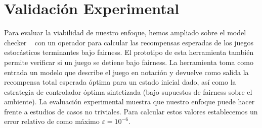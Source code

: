 \section{Validación Experimental} \label{sec:experimental_eval_fair}


Para evaluar la viabilidad de nuestro enfoque, hemos ampliado sobre el model checker {\Prism}~\cite{DBLP:conf/cav/KwiatkowskaN0S20,DBLP:conf/cav/KwiatkowskaNP11} con un operador para calcular las recompensas esperadas de los juegos estocásticos terminantes bajo fairness. El prototipo de esta herramienta también permite verificar si un juego se detiene bajo fairness.
La herramienta toma como entrada un modelo que describe el juego en notación {\Prism} y devuelve como salida
la recompensa total esperada óptima para un estado inicial dado, así como la estrategia de controlador óptima sintetizada (bajo supuestos de fairness sobre el ambiente).
La evaluación experimental muestra que nuestro enfoque puede hacer frente a estudios de casos no triviales. Para calcular estos valores establecemos un error relativo de como máximo $\varepsilon = 10^{-6}$.


